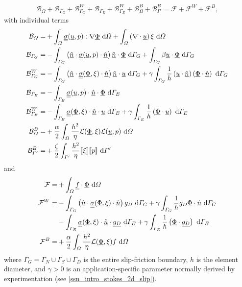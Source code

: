\begin{align}
  \label{intro_stokes_slip_stab_var_form}
  \mathcal{B}_{\Omega} + \mathcal{B}_{\Gamma_G} + \mathcal{B}_{\Gamma_G}^W + \mathcal{B}_{\Gamma_E} + \mathcal{B}_{\Gamma_E}^W + \mathcal{B}_{\Omega}^B + \mathcal{B}_{\Gamma'}^B = \mathcal{F} + \mathcal{F}^W + \mathcal{F}^B,
\end{align}
with individual terms
\begin{align*}
  \mathcal{B}_{\varOmega} = &+ \int_{\varOmega} \underline{\underline{\sigma}}(\underline{u},p) : \nabla \underline{\Phi} \ \mathrm{d}\varOmega + \int_{\varOmega} \left( \nabla \cdot \underline{u} \right) \xi \ \mathrm{d}\varOmega \\
  \mathcal{B}_{\varGamma_G} = &- \int_{\varGamma_G} \left( \underline{\hat{n}} \cdot \underline{\underline{\sigma}}(\underline{u},p) \cdot \underline{\hat{n}} \right) \underline{\hat{n}} \cdot \underline{\Phi} \ \mathrm{d}\varGamma_G + \int_{\varGamma_G} \beta \underline{u} \cdot \underline{\Phi} \ \mathrm{d}\varGamma_G \\
  \mathcal{B}_{\varGamma_G}^W = &- \int_{\varGamma_G} \left( \underline{\hat{n}} \cdot \underline{\underline{\sigma}}(\underline{\Phi},\xi) \cdot \underline{\hat{n}} \right) \underline{\hat{n}} \cdot \underline{u}  \ \mathrm{d}\varGamma_G + \gamma \int_{\varGamma_G} \frac{1}{h} \left( \underline{u} \cdot \underline{\hat{n}} \right) \left( \underline{\Phi} \cdot \underline{\hat{n}} \right) \ \mathrm{d}\varGamma_G \\
  \mathcal{B}_{\varGamma_E} = &- \int_{\varGamma_E} \underline{\underline{\sigma}}(\underline{u},p) \cdot \underline{\hat{n}} \cdot \underline{\Phi} \ \mathrm{d}\varGamma_E \\
  \mathcal{B}_{\varGamma_E}^W = &- \int_{\varGamma_E} \underline{\underline{\sigma}}(\underline{\Phi},\xi) \cdot \underline{\hat{n}} \cdot \underline{u} \ \mathrm{d}\varGamma_E + \gamma \int_{\varGamma_E} \frac{1}{h}  \left( \underline{\Phi} \cdot \underline{u} \right) \ \mathrm{d}\varGamma_E \\
  \mathcal{B}_{\varOmega}^B = &+ \frac{\alpha}{2} \int_{\varOmega} \frac{h^2}{\eta} \mathcal{L}(\underline{\Phi},\xi) \mathcal{L}(\underline{u},p) \ \mathrm{d}\varOmega \\
  \mathcal{B}_{\varGamma'}^B = &+ \frac{\zeta}{2} \int_{\varGamma'} \frac{h^2}{\eta} \llbracket \xi \rrbracket \llbracket p \rrbracket \ \mathrm{d}\varGamma'
\end{align*}
and
\begin{align*}
  \mathcal{F} = &+ \int_{\varOmega} \underline{f} \cdot \underline{\Phi} \ \mathrm{d}\varOmega \\ 
  \mathcal{F}^W = &- \int_{\varGamma_G} \left( \underline{\hat{n}} \cdot \underline{\underline{\sigma}}(\underline{\Phi},\xi) \cdot \underline{\hat{n}} \right) g_D \ \mathrm{d}\varGamma_G + \gamma \int_{\varGamma_G} \frac{1}{h} g_D \underline{\Phi} \cdot \underline{\hat{n}} \ \mathrm{d}\varGamma_G \\
  &- \int_{\varGamma_E} \underline{\underline{\sigma}}(\underline{\Phi},\xi) \cdot \underline{\hat{n}} \cdot \underline{g_D} \ \mathrm{d}\varGamma_E + \gamma \int_{\varGamma_E} \frac{1}{h} \left( \underline{\Phi} \cdot \underline{g_D} \right) \ \mathrm{d}\varGamma_E \\
  \mathcal{F}^B = & +\frac{\alpha}{2} \int_{\varOmega} \frac{h^2}{\eta} \mathcal{L}(\underline{\Phi},\xi) f \ \mathrm{d}\varOmega
\end{align*}
where $\Gamma_G = \Gamma_N \cup \Gamma_S \cup \Gamma_D$ is the entire slip-friction boundary, $h$ is the element diameter, and $\gamma > 0$ is an application-specific parameter normally derived by experimentation (see \cref{ssn_intro_stokes_2d_slip}).
  
